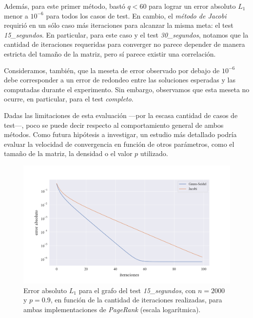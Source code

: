 \vspace{1em}
Además, para este primer método, bastó $q < 60$ para lograr un error absoluto $L_1$ menor a $10^{-6}$ para todos los casos de test. En cambio, el \textit{método de Jacobi} requirió en un sólo caso más iteraciones para alcanzar la misma meta: el test \textit{15\_segundos}. En particular, para este caso y el test \textit{30\_segundos}, notamos que la cantidad de iteraciones requeridas para converger no parece depender de manera estricta del tamaño de la matriz, pero sí parece existir una correlación.

\vspace{1em}
Consideramos, también, que la meseta de error observado por debajo de $10^{-6}$ debe corresponder a un error de redondeo entre las soluciones esperadas y las computadas durante el experimento. Sin embargo, observamos que esta meseta no ocurre, en particular, para el test \textit{completo}.

\vspace{1em}
Dadas las limitaciones de esta evaluación ---por la escasa cantidad de casos de test---, poco se puede decir respecto al comportamiento general de ambos métodos. Como futura hipótesis a investigar, un estudio más detallado podría evaluar la velocidad de convergencia en función de otros parámetros, como el tamaño de la matriz, la densidad o el valor $p$ utilizado. 

\begin{figure}[!htbp]
    \centering
    \includegraphics[width=1\textwidth, trim=0 0 0 30]{files/src/.media/convergencia_test_15_segundos.png}
    \caption{Error absoluto $L_1$ para el grafo del test \textit{15\_segundos}, con $n = 2000$ y $p = 0.9$, en función de la cantidad de iteraciones realizadas, para ambas implementaciones de \textit{PageRank} (escala logarítmica).} \label{test_15_segundos}
\end{figure}

